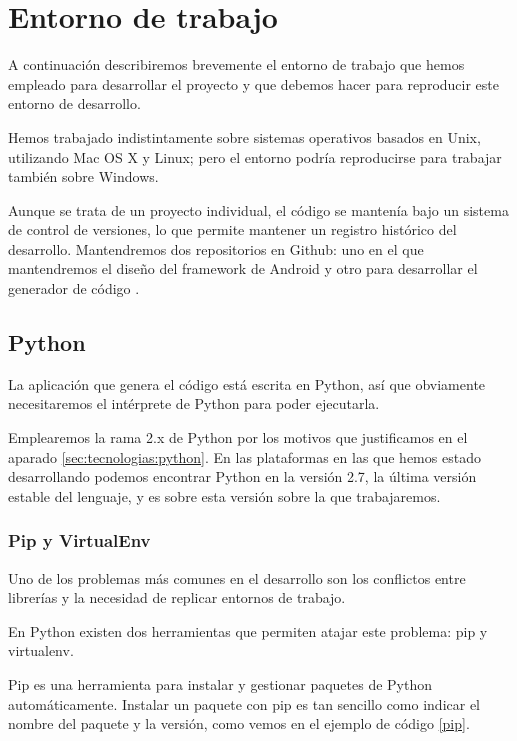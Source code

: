\section{Entorno de trabajo}

A continuación describiremos brevemente el entorno de trabajo que hemos empleado para desarrollar el proyecto y que debemos hacer para reproducir este entorno de desarrollo.\par
Hemos trabajado indistintamente sobre sistemas operativos basados en Unix, utilizando Mac OS X y Linux; pero el entorno podría reproducirse para trabajar también sobre Windows.\par
Aunque se trata de un proyecto individual, el código se mantenía bajo un sistema de control de versiones, lo que permite mantener un registro histórico del desarrollo. Mantendremos dos repositorios en Github: uno en el que mantendremos el diseño del framework de Android \cite{meer:android} y otro para desarrollar el generador de código \cite{meer}.\par

\subsection{Python}
La aplicación que genera el código está escrita en Python, así que obviamente necesitaremos el intérprete de Python para poder ejecutarla.\par
Emplearemos la rama 2.x de Python por los motivos que justificamos en el aparado \ref{sec:tecnologias:python}. En las plataformas en las que hemos estado desarrollando podemos encontrar Python en la versión 2.7, la última versión estable del lenguaje, y es sobre esta versión sobre la que trabajaremos.\par

\subsubsection{Pip y VirtualEnv}\label{sec:virtualenv}
Uno de los problemas más comunes en el desarrollo son los conflictos entre librerías y la necesidad de replicar entornos de trabajo.\par 
En Python existen dos herramientas que permiten atajar este problema: pip y virtualenv. \par
Pip es una herramienta para instalar y gestionar paquetes de Python automáticamente. Instalar un paquete con pip es tan sencillo como indicar el nombre del paquete y la versión, como vemos en el ejemplo de código \ref{pip}.\par

